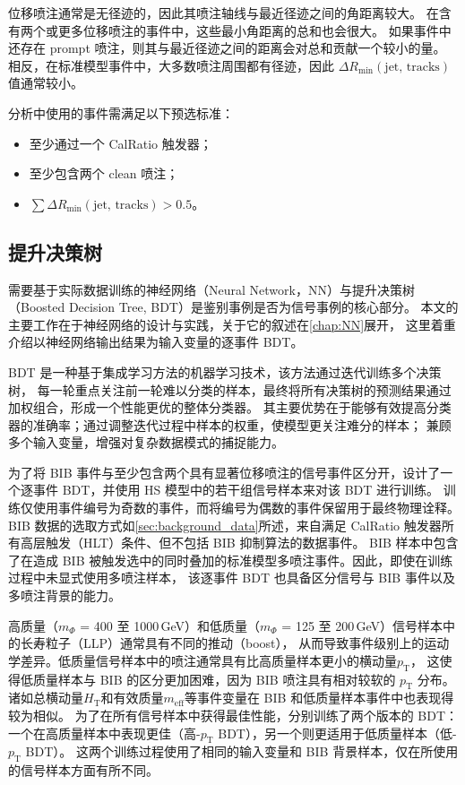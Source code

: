 位移喷注通常是无径迹的，因此其喷注轴线与最近径迹之间的角距离较大。
在含有两个或更多位移喷注的事件中，这些最小角距离的总和也会很大。
如果事件中还存在 prompt 喷注，则其与最近径迹之间的距离会对总和贡献一个较小的量。
相反，在标准模型事件中，大多数喷注周围都有径迹，因此 \(\Delta R_{\text{min}}(\text{jet, tracks})\) 值通常较小。

分析中使用的事件需满足以下预选标准：
\begin{itemize}
    \item 至少通过一个 CalRatio 触发器；
    \item 至少包含两个 clean 喷注；
    \item \(\sum \Delta R_{\text{min}}(\text{jet, tracks}) > 0.5\)。
\end{itemize}


\subsection{提升决策树}
\label{sec:BDT}

需要基于实际数据训练的神经网络（Neural Network，NN）与提升决策树（Boosted Decision Tree, BDT）是鉴别事例是否为信号事例的核心部分。
本文的主要工作在于神经网络的设计与实践，关于它的叙述在\autoref{chap:NN}展开，
这里着重介绍以神经网络输出结果为输入变量的逐事件 BDT。

BDT 是一种基于集成学习方法的机器学习技术，该方法通过迭代训练多个决策树，
每一轮重点关注前一轮难以分类的样本，最终将所有决策树的预测结果通过加权组合，形成一个性能更优的整体分类器。
其主要优势在于能够有效提高分类器的准确率；通过调整迭代过程中样本的权重，使模型更关注难分的样本；
兼顾多个输入变量，增强对复杂数据模式的捕捉能力。

为了将 BIB 事件与至少包含两个具有显著位移喷注的信号事件区分开，设计了一个逐事件 BDT，并使用 HS 模型中的若干组信号样本来对该 BDT 进行训练。
训练仅使用事件编号为奇数的事件，而将编号为偶数的事件保留用于最终物理诠释。
BIB 数据的选取方式如\autoref{sec:background_data}所述，来自满足 CalRatio 触发器所有高层触发（HLT）条件、但不包括 BIB 抑制算法的数据事件。
BIB 样本中包含了在造成 BIB 被触发选中的同时叠加的标准模型多喷注事件。因此，即使在训练过程中未显式使用多喷注样本，
该逐事件 BDT 也具备区分信号与 BIB 事件以及多喷注背景的能力。

高质量（$m_\Phi$ = 400 至 1000\,GeV）和低质量（$m_\Phi$ = 125 至 200\,GeV）信号样本中的长寿粒子（LLP）通常具有不同的推动（boost），
从而导致事件级别上的运动学差异。低质量信号样本中的喷注通常具有比高质量样本更小的横动量$p_\mathrm{T}$，
这使得低质量样本与 BIB 的区分更加困难，因为 BIB 喷注具有相对较软的 $p_\mathrm{T}$ 分布。
诸如总横动量$H_\mathrm{T}$和有效质量$m_\mathrm{eff}$等事件变量在 BIB 和低质量样本事件中也表现得较为相似。
为了在所有信号样本中获得最佳性能，分别训练了两个版本的 BDT：
一个在高质量样本中表现更佳（高-$p_\mathrm{T}$ BDT），另一个则更适用于低质量样本（低-$p_\mathrm{T}$ BDT）。
这两个训练过程使用了相同的输入变量和 BIB 背景样本，仅在所使用的信号样本方面有所不同。

